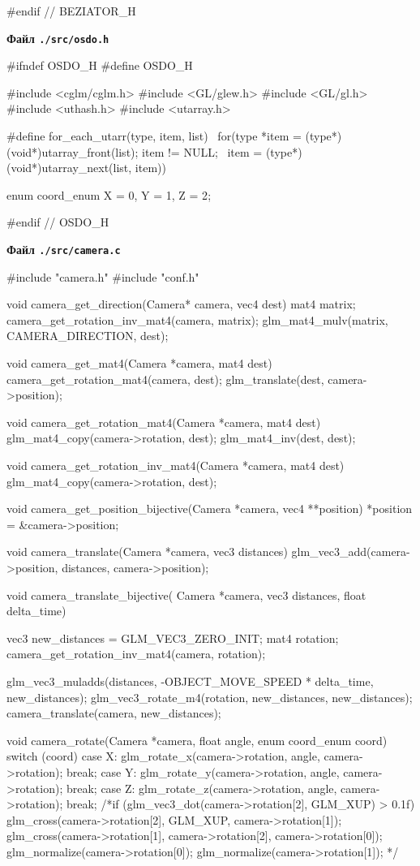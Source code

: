 \begin{multicols}{2}
\begin{ccode}
#endif // BEZIATOR_H
\end{ccode}
\noindent\cprotect\textbf{Файл \verb+./src/osdo.h+}
\begin{ccode}
#ifndef OSDO_H
#define OSDO_H

#include <cglm/cglm.h>
#include <GL/glew.h>
#include <GL/gl.h>
#include <uthash.h>
#include <utarray.h>

#define for_each_utarr(type, item, list) \
    for(type *item = (type*)(void*)utarray_front(list); item != NULL; \
        item = (type*)(void*)utarray_next(list, item))

enum coord_enum {X = 0, Y = 1, Z = 2};

#endif // OSDO_H
\end{ccode}
\noindent\cprotect\textbf{Файл \verb+./src/camera.c+}
\begin{ccode}
#include "camera.h"
#include "conf.h"

void camera_get_direction(Camera* camera, vec4 dest) {
    mat4 matrix;
    camera_get_rotation_inv_mat4(camera, matrix);
    glm_mat4_mulv(matrix, CAMERA_DIRECTION, dest);
}

void camera_get_mat4(Camera *camera, mat4 dest) {
    camera_get_rotation_mat4(camera, dest);
    glm_translate(dest, camera->position);
}

void camera_get_rotation_mat4(Camera *camera, mat4 dest) {
    glm_mat4_copy(camera->rotation, dest);
    glm_mat4_inv(dest, dest);
}

void camera_get_rotation_inv_mat4(Camera *camera, mat4 dest) {
    glm_mat4_copy(camera->rotation, dest);
}

void camera_get_position_bijective(Camera *camera, vec4 **position) {
    *position = &camera->position;
}

void camera_translate(Camera *camera, vec3 distances) {
    glm_vec3_add(camera->position, distances, camera->position);
}

void camera_translate_bijective(
        Camera *camera, vec3 distances, float delta_time) {
    vec3 new_distances = GLM_VEC3_ZERO_INIT;
    mat4 rotation;
    camera_get_rotation_inv_mat4(camera, rotation);

    glm_vec3_muladds(distances, -OBJECT_MOVE_SPEED * delta_time,
                     new_distances);
    glm_vec3_rotate_m4(rotation, new_distances, new_distances);
    camera_translate(camera, new_distances);
}

void camera_rotate(Camera *camera, float angle, enum coord_enum coord) {
    switch (coord) {
    case X: glm_rotate_x(camera->rotation, angle, camera->rotation); break;
    case Y: glm_rotate_y(camera->rotation, angle, camera->rotation); break;
    case Z: glm_rotate_z(camera->rotation, angle, camera->rotation); break;
    }
    /*if (glm_vec3_dot(camera->rotation[2], GLM_XUP) > 0.1f) {
        glm_cross(camera->rotation[2], GLM_XUP, camera->rotation[1]);
        glm_cross(camera->rotation[1], camera->rotation[2], camera->rotation[0]);
        glm_normalize(camera->rotation[0]);
        glm_normalize(camera->rotation[1]);
    }*/
}


\end{ccode}
\end{multicols}
